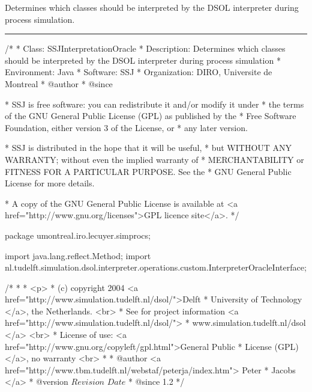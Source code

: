 
Determines which classes should be interpreted by the DSOL
interpreter during process simulation.

\bigskip\hrule

\begin{code}
\begin{hide}
/*
 * Class:        SSJInterpretationOracle
 * Description:  Determines which classes should be interpreted by the DSOL
                 interpreter during process simulation
 * Environment:  Java
 * Software:     SSJ 
 * Organization: DIRO, Universite de Montreal
 * @author       
 * @since

 * SSJ is free software: you can redistribute it and/or modify it under
 * the terms of the GNU General Public License (GPL) as published by the
 * Free Software Foundation, either version 3 of the License, or
 * any later version.

 * SSJ is distributed in the hope that it will be useful,
 * but WITHOUT ANY WARRANTY; without even the implied warranty of
 * MERCHANTABILITY or FITNESS FOR A PARTICULAR PURPOSE.  See the
 * GNU General Public License for more details.

 * A copy of the GNU General Public License is available at
   <a href="http://www.gnu.org/licenses">GPL licence site</a>.
 */
\end{hide}
package umontreal.iro.lecuyer.simprocs;\begin{hide}

import java.lang.reflect.Method;
import nl.tudelft.simulation.dsol.interpreter.operations.custom.InterpreterOracleInterface;

/*
 *
 * <p>
 * (c) copyright 2004 <a href="http://www.simulation.tudelft.nl/dsol/">Delft
 * University of Technology </a>, the Netherlands. <br>
 * See for project information <a href="http://www.simulation.tudelft.nl/dsol/">
 * www.simulation.tudelft.nl/dsol </a> <br>
 * License of use: <a href="http://www.gnu.org/copyleft/gpl.html">General Public
 * License (GPL) </a>, no warranty <br>
 *
 * @author <a href="http://www.tbm.tudelft.nl/webstaf/peterja/index.htm"> Peter
 *         Jacobs </a>
 * @version $Revision$ $Date$
 * @since 1.2
 */ \end{hide}



\end{code}
